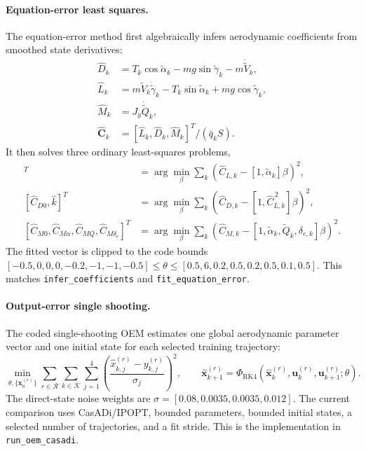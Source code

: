 \documentclass[11pt]{article}
\begin{document}
\paragraph{Equation-error least squares.}
The equation-error method first algebraically infers aerodynamic coefficients
from smoothed state derivatives:
\begin{align}
    \widehat{D}_k
        &= T_k\cos\widetilde{\alpha}_k
         -mg\sin\widetilde{\gamma}_k
         -m\dot{\widetilde{V}}_k,\\
    \widehat{L}_k
        &= m\widetilde{V}_k\dot{\widetilde{\gamma}}_k
         -T_k\sin\widetilde{\alpha}_k
         +mg\cos\widetilde{\gamma}_k,\\
    \widehat{M}_k
        &= J_y\dot{\widetilde{Q}}_k,\\
    \widehat{\mathbf{C}}_k
        &= [\widehat{L}_k,\widehat{D}_k,\widehat{M}_k]^T
           /(\bar{q}_k S).
        \label{eq:code_inferred_coefficients}
\end{align}
It then solves three ordinary least-squares problems,
\begin{align}
    [\widehat{C}_{L0},\widehat{C}_{L\alpha}]^T
        &= \arg\min_{\beta}\sum_k
        \left(\widehat{C}_{L,k}-[1,\widetilde{\alpha}_k]\beta\right)^2,\\
    [\widehat{C}_{D0},\widehat{k}]^T
        &= \arg\min_{\beta}\sum_k
        \left(\widehat{C}_{D,k}-[1,\widehat{C}_{L,k}^{\,2}]\beta\right)^2,\\
    [\widehat{C}_{M0},\widehat{C}_{M\alpha},
     \widehat{C}_{MQ},\widehat{C}_{M\delta_e}]^T
        &= \arg\min_{\beta}\sum_k
        \left(\widehat{C}_{M,k}
        -[1,\widetilde{\alpha}_k,\widetilde{Q}_k,\delta_{e,k}]\beta\right)^2.
        \label{eq:code_equation_error}
\end{align}
The fitted vector is clipped to the code bounds
$[-0.5,0,0,0,-0.2,-1,-1,-0.5]\le\theta\le
[0.5,6,0.2,0.5,0.2,0.5,0.1,0.5]$. This matches
\texttt{infer\_coefficients} and \texttt{fit\_equation\_error}.

\paragraph{Output-error single shooting.}
The coded single-shooting OEM estimates one global aerodynamic parameter vector
and one initial state for each selected training trajectory:
\begin{equation}
    \min_{\theta,\{\mathbf{x}_{0}^{(r)}\}}
    \sum_{r\in\mathcal{R}}\sum_{k\in\mathcal{K}}\sum_{j=1}^{4}
    \left(
    \frac{\hat{x}_{k,j}^{(r)}-y_{k,j}^{(r)}}{\sigma_j}
    \right)^2,
    \qquad
    \hat{\mathbf{x}}_{k+1}^{(r)}
    =
    \Phi_{\mathrm{RK4}}
    (\hat{\mathbf{x}}_{k}^{(r)},\mathbf{u}_{k}^{(r)},\mathbf{u}_{k+1}^{(r)};
    \theta).
    \label{eq:code_oem_ss}
\end{equation}
The direct-state noise weights are
$\sigma=[0.08,0.0035,0.0035,0.012]$. The current comparison uses CasADi/IPOPT,
bounded parameters, bounded initial states, a selected number of trajectories,
and a fit stride. This is the implementation in
\texttt{run\_oem\_casadi}.
\end{document}
